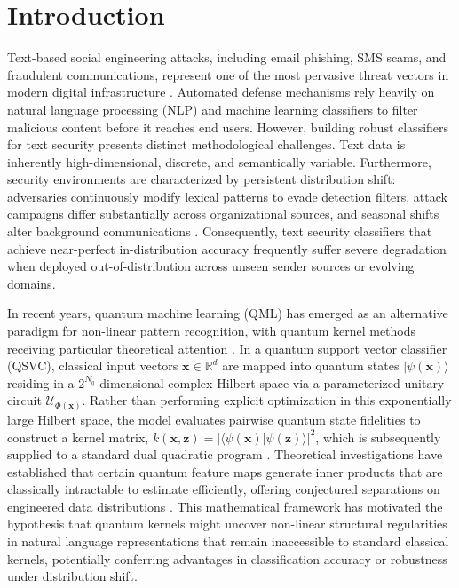 \documentclass[10pt,twocolumn,letterpaper]{article}
\begin{document}
\section{Introduction}
\label{sec:intro}

Text-based social engineering attacks, including email phishing, SMS scams, and fraudulent communications, represent one of the most pervasive threat vectors in modern digital infrastructure \cite{alsallami2023empirical,ren2022generating,ammar2026quantum}. Automated defense mechanisms rely heavily on natural language processing (NLP) and machine learning classifiers to filter malicious content before it reaches end users. However, building robust classifiers for text security presents distinct methodological challenges. Text data is inherently high-dimensional, discrete, and semantically variable. Furthermore, security environments are characterized by persistent distribution shift: adversaries continuously modify lexical patterns to evade detection filters, attack campaigns differ substantially across organizational sources, and seasonal shifts alter background communications \cite{alsallami2023empirical,cova2008detection,verma2017detecting}. Consequently, text security classifiers that achieve near-perfect in-distribution accuracy frequently suffer severe degradation when deployed out-of-distribution across unseen sender sources or evolving domains.

In recent years, quantum machine learning (QML) has emerged as an alternative paradigm for non-linear pattern recognition, with quantum kernel methods receiving particular theoretical attention \cite{havlicek2019supervised,schuld2019quantum}. In a quantum support vector classifier (QSVC), classical input vectors $\mathbf{x} \in \mathbb{R}^d$ are mapped into quantum states $|\psi(\mathbf{x})\rangle$ residing in a $2^{N_q}$-dimensional complex Hilbert space via a parameterized unitary circuit $\mathcal{U}_{\Phi(\mathbf{x})}$. Rather than performing explicit optimization in this exponentially large Hilbert space, the model evaluates pairwise quantum state fidelities to construct a kernel matrix, $k(\mathbf{x}, \mathbf{z}) = |\langle \psi(\mathbf{x}) | \psi(\mathbf{z}) \rangle|^2$, which is subsequently supplied to a standard dual quadratic program \cite{cortes1995support,havlicek2019supervised}. Theoretical investigations have established that certain quantum feature maps generate inner products that are classically intractable to estimate efficiently, offering conjectured separations on engineered data distributions \cite{huang2021power,liu2021rigorous}. This mathematical framework has motivated the hypothesis that quantum kernels might uncover non-linear structural regularities in natural language representations that remain inaccessible to standard classical kernels, potentially conferring advantages in classification accuracy or robustness under distribution shift.
\end{document}
